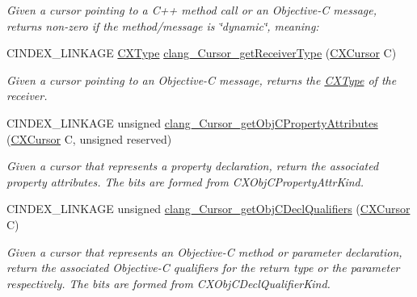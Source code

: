 \begin{DoxyCompactItemize}
\begin{DoxyCompactList}\small\item\em Given a cursor pointing to a C++ method call or an Objective-\/C message, returns non-\/zero if the method/message is \char`\"{}dynamic\char`\"{}, meaning\+: \end{DoxyCompactList}\item 
\mbox{\label{group__CINDEX__CURSOR__XREF_ga252a679781181d3a6dbd680a215c9594}} 
C\+I\+N\+D\+E\+X\+\_\+\+L\+I\+N\+K\+A\+GE \mbox{\hyperlink{structCXType}{C\+X\+Type}} \mbox{\hyperlink{group__CINDEX__CURSOR__XREF_ga252a679781181d3a6dbd680a215c9594}{clang\+\_\+\+Cursor\+\_\+get\+Receiver\+Type}} (\mbox{\hyperlink{structCXCursor}{C\+X\+Cursor}} C)
\begin{DoxyCompactList}\small\item\em Given a cursor pointing to an Objective-\/C message, returns the \mbox{\hyperlink{structCXType}{C\+X\+Type}} of the receiver. \end{DoxyCompactList}\item 
C\+I\+N\+D\+E\+X\+\_\+\+L\+I\+N\+K\+A\+GE unsigned \mbox{\hyperlink{group__CINDEX__CURSOR__XREF_ga3a964b4c56f8bfb8229a9a08114e2567}{clang\+\_\+\+Cursor\+\_\+get\+Obj\+C\+Property\+Attributes}} (\mbox{\hyperlink{structCXCursor}{C\+X\+Cursor}} C, unsigned reserved)
\begin{DoxyCompactList}\small\item\em Given a cursor that represents a property declaration, return the associated property attributes. The bits are formed from {\ttfamily C\+X\+Obj\+C\+Property\+Attr\+Kind}. \end{DoxyCompactList}\item 
\mbox{\label{group__CINDEX__CURSOR__XREF_ga551d4dd1d81d7a818b68cf3811546671}} 
C\+I\+N\+D\+E\+X\+\_\+\+L\+I\+N\+K\+A\+GE unsigned \mbox{\hyperlink{group__CINDEX__CURSOR__XREF_ga551d4dd1d81d7a818b68cf3811546671}{clang\+\_\+\+Cursor\+\_\+get\+Obj\+C\+Decl\+Qualifiers}} (\mbox{\hyperlink{structCXCursor}{C\+X\+Cursor}} C)
\begin{DoxyCompactList}\small\item\em Given a cursor that represents an Objective-\/C method or parameter declaration, return the associated Objective-\/C qualifiers for the return type or the parameter respectively. The bits are formed from C\+X\+Obj\+C\+Decl\+Qualifier\+Kind. \end{DoxyCompactList}\item 

\end{DoxyCompactItemize}
